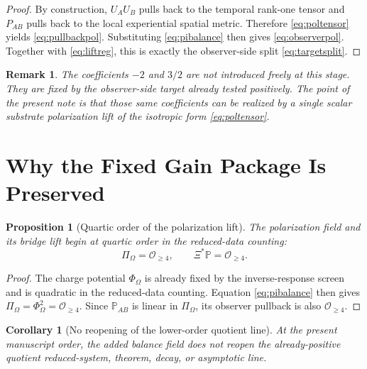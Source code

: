 \documentclass[11pt]{article}
\newcommand{\PolTen}{\mathbb P}
\newcommand{\ObserverMap}{\Xi}
\newcommand{\ProjSub}{P}
\newcommand{\FlowPot}{\Phi_\Omega}
\newcommand{\BalanceField}{\Pi_\Omega}
\newtheorem{proposition}{Proposition}
\newtheorem{remark}{Remark}
\newtheorem{corollary}{Corollary}
\begin{document}
\begin{proof}
By construction, \(U_AU_B\) pulls back to the temporal rank-one tensor and \(\ProjSub_{AB}\) pulls back to the local experiential spatial metric. Therefore \eqref{eq:poltensor} yields \eqref{eq:pullbackpol}. Substituting \eqref{eq:pibalance} then gives \eqref{eq:observerpol}. Together with \eqref{eq:liftreg}, this is exactly the observer-side split \eqref{eq:targetsplit}.
\end{proof}

\begin{remark}
The coefficients \(-2\) and \(3/2\) are not introduced freely at this stage. They are fixed by the observer-side target already tested positively. The point of the present note is that those same coefficients can be realized by a single scalar substrate polarization lift of the isotropic form \eqref{eq:poltensor}.
\end{remark}

\section{Why the Fixed Gain Package Is Preserved}

\begin{proposition}[Quartic order of the polarization lift]
\label{prop:quartic}
The polarization field and its bridge lift begin at quartic order in the reduced-data counting:
\begin{equation}
\BalanceField=\mathcal O_{\ge 4},
\qquad
\ObserverMap^*\PolTen=\mathcal O_{\ge 4}.
\label{eq:quartic}
\end{equation}
\end{proposition}

\begin{proof}
The charge potential \(\FlowPot\) is already fixed by the inverse-response screen and is quadratic in the reduced-data counting. Equation \eqref{eq:pibalance} then gives \(\BalanceField=\FlowPot^2=\mathcal O_{\ge 4}\). Since \(\PolTen_{AB}\) is linear in \(\BalanceField\), its observer pullback is also \(\mathcal O_{\ge 4}\).
\end{proof}

\begin{corollary}[No reopening of the lower-order quotient line]
\label{cor:no_pde}
At the present manuscript order, the added balance field does not reopen the already-positive quotient reduced-system, theorem, decay, or asymptotic line.
\end{corollary}
\end{document}
